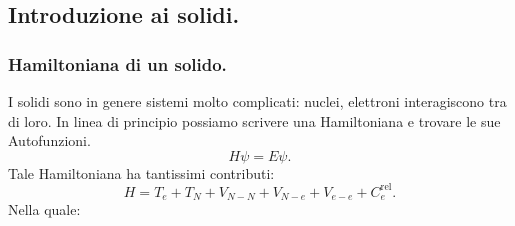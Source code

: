 \subsection{Introduzione ai solidi.}
\label{subsec:Solidi}
\subsubsection{Hamiltoniana di un solido.}%
\label{subsub:Hamiltoniana di un solido.}

I solidi sono in genere sistemi molto complicati: nuclei, elettroni interagiscono tra di loro. In linea di principio possiamo scrivere una Hamiltoniana e trovare le sue Autofunzioni.
\[
	H \psi = E \psi
.\] 
Tale Hamiltoniana ha tantissimi contributi:
\[
	H = T_e + T_N + V_{N-N} + V_{N-e} + V_{e-e} + C_e^{\text{rel}}
.\] 
Nella quale:
